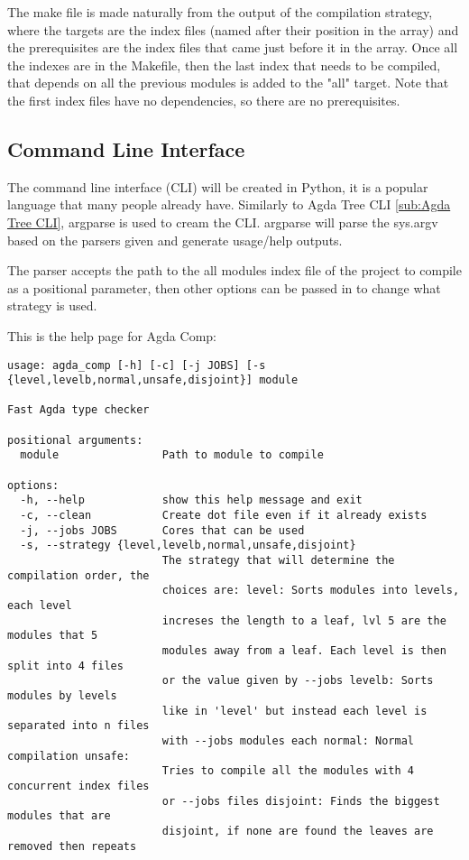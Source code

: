 The make file is made naturally from the output of the compilation strategy,
where the targets are the index files (named after their position in the array)
and the prerequisites are the index files that came just before it in the
array. Once all the indexes are in the Makefile, then the last index that needs
to be compiled, that depends on all the previous modules is added to the "all"
target. Note that the first index files have no dependencies, so there are no
prerequisites.


\subsection{Command Line Interface}

The command line interface (CLI) will be created in Python, it is a popular
language that many people already have. Similarly to Agda Tree CLI 
\cref{sub:Agda Tree CLI}, argparse is used to cream the CLI. argparse will parse
the sys.argv based on the parsers given and generate usage/help outputs.

The parser accepts the path to the all modules index file of the project to
compile as a positional parameter, then other options can be passed in to
change what strategy is used.

This is the help page for Agda Comp:
\begin{lstlisting}
usage: agda_comp [-h] [-c] [-j JOBS] [-s {level,levelb,normal,unsafe,disjoint}] module

Fast Agda type checker

positional arguments:
  module                Path to module to compile

options:
  -h, --help            show this help message and exit
  -c, --clean           Create dot file even if it already exists
  -j, --jobs JOBS       Cores that can be used
  -s, --strategy {level,levelb,normal,unsafe,disjoint}
                        The strategy that will determine the compilation order, the
                        choices are: level: Sorts modules into levels, each level
                        increses the length to a leaf, lvl 5 are the modules that 5
                        modules away from a leaf. Each level is then split into 4 files
                        or the value given by --jobs levelb: Sorts modules by levels
                        like in 'level' but instead each level is separated into n files
                        with --jobs modules each normal: Normal compilation unsafe:
                        Tries to compile all the modules with 4 concurrent index files
                        or --jobs files disjoint: Finds the biggest modules that are
                        disjoint, if none are found the leaves are removed then repeats
\end{lstlisting}

